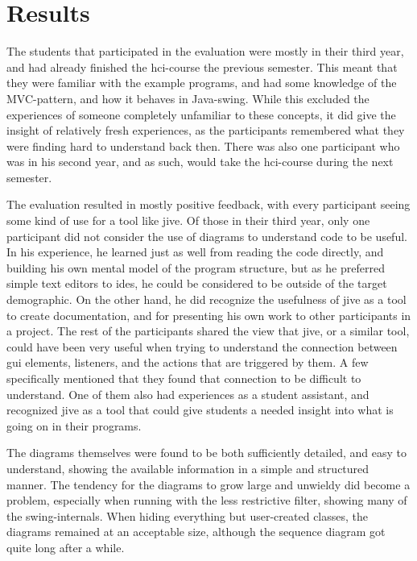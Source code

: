 \section{Results}\label{jiveEvalResults}
The students that participated in the evaluation were mostly in their third year, and had already finished the \gls{hci}-course the previous semester.
This meant that they were familiar with the example programs, and had some knowledge of the MVC-pattern, and how it behaves in Java-swing.
While this excluded the experiences of someone completely unfamiliar to these concepts, it did give the insight of relatively fresh experiences, as the participants remembered what they were finding hard to understand back then.
There was also one participant who was in his second year, and as such, would take the \gls{hci}-course during the next semester.

The evaluation resulted in mostly positive feedback, with every participant seeing some kind of use for a tool like \gls{jive}.
Of those in their third year, only one participant did not consider the use of diagrams to understand code to be useful.
In his experience, he learned just as well from reading the code directly, and building his own mental model of the program structure, but as he preferred simple text editors to \gls{ide}s, he could be considered to be outside of the target demographic.
On the other hand, he did recognize the usefulness of \gls{jive} as a tool to create documentation, and for presenting his own work to other participants in a project.
The rest of the participants shared the view that \gls{jive}, or a similar tool, could have been very useful when trying to understand the connection between \gls{gui} elements, listeners, and the actions that are triggered by them.
A few specifically mentioned that they found that connection to be difficult to understand.
One of them also had experiences as a student assistant, and recognized \gls{jive} as a tool that could give students a needed insight into what is going on in their programs.

The diagrams themselves were found to be both sufficiently detailed, and easy to understand, showing the available information in a simple and structured manner.
The tendency for the diagrams to grow large and unwieldy did become a problem, especially when running with the less restrictive filter, showing many of the swing-internals.
When hiding everything but user-created classes, the diagrams remained at an acceptable size, although the sequence diagram got quite long after a while.

